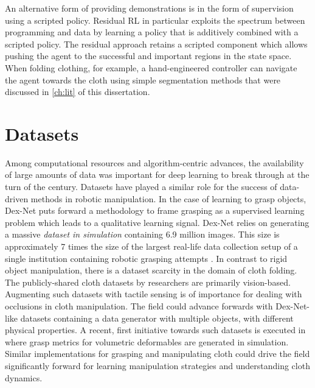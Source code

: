 \documentclass[\home/main.tex]{subfiles}
\begin{document}
An alternative form of providing demonstrations is in the form of supervision using a scripted policy. Residual RL in particular exploits the spectrum between programming and data by learning a policy that is additively combined with a scripted policy. The residual approach retains a scripted component which allows pushing the agent to the successful and important regions in the state space. When folding clothing, for example, a hand-engineered controller can navigate the agent towards the cloth using simple segmentation methods that were discussed in \cref{ch:lit} of this dissertation. 

\section{Datasets}

Among computational resources and algorithm-centric advances, the availability of large amounts of data was important for deep learning to break through at the turn of the century. Datasets have played a similar role for the success of data-driven methods in robotic manipulation. In the case of learning to grasp objects, Dex-Net \autocite{dexnet2} puts forward a methodology to frame grasping as a supervised learning problem which leads to a qualitative learning signal. Dex-Net relies on generating a massive \emph{dataset in simulation} containing 6.9 million images. This size is approximately 7 times the size of the largest real-life data collection setup of a single institution containing robotic grasping attempts \autocite{Levine2016}. In contrast to rigid object manipulation, there is a dataset scarcity in the domain of cloth folding. The publicly-shared cloth datasets by researchers are primarily vision-based. Augmenting such datasets with tactile sensing is of importance for dealing with occlusions in cloth manipulation. The field could advance forwards with Dex-Net-like datasets containing a data generator with multiple objects, with different physical properties. A recent, first initiative towards such datasets is executed in \textcite{DefGraspSim} where grasp metrics for volumetric deformables are generated in simulation. Similar implementations for grasping and manipulating cloth could drive the field significantly forward for learning manipulation strategies and understanding cloth dynamics. 
\end{document}
